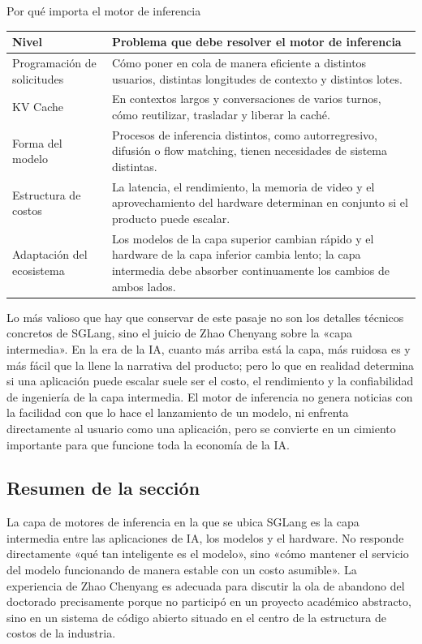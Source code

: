 \begin{knowledgebox}{Por qué importa el motor de inferencia}
\begin{tabularx}{\textwidth}{>{\raggedright\arraybackslash}p{} Y}
\toprule
Nivel & Problema que debe resolver el motor de inferencia \\
\midrule
Programación de solicitudes & Cómo poner en cola de manera eficiente a distintos usuarios, distintas longitudes de contexto y distintos lotes. \\
KV Cache & En contextos largos y conversaciones de varios turnos, cómo reutilizar, trasladar y liberar la caché. \\
Forma del modelo & Procesos de inferencia distintos, como autorregresivo, difusión o flow matching, tienen necesidades de sistema distintas. \\
Estructura de costos & La latencia, el rendimiento, la memoria de video y el aprovechamiento del hardware determinan en conjunto si el producto puede escalar. \\
Adaptación del ecosistema & Los modelos de la capa superior cambian rápido y el hardware de la capa inferior cambia lento; la capa intermedia debe absorber continuamente los cambios de ambos lados. \\
\bottomrule
\end{tabularx}
\end{knowledgebox}

Lo más valioso que hay que conservar de este pasaje no son los detalles técnicos concretos de SGLang, sino el juicio de Zhao Chenyang sobre la «capa intermedia». En la era de la IA, cuanto más arriba está la capa, más ruidosa es y más fácil que la llene la narrativa del producto; pero lo que en realidad determina si una aplicación puede escalar suele ser el costo, el rendimiento y la confiabilidad de ingeniería de la capa intermedia. El motor de inferencia no genera noticias con la facilidad con que lo hace el lanzamiento de un modelo, ni enfrenta directamente al usuario como una aplicación, pero se convierte en un cimiento importante para que funcione toda la economía de la IA.

\subsection{Resumen de la sección}

La capa de motores de inferencia en la que se ubica SGLang es la capa intermedia entre las aplicaciones de IA, los modelos y el hardware. No responde directamente «qué tan inteligente es el modelo», sino «cómo mantener el servicio del modelo funcionando de manera estable con un costo asumible». La experiencia de Zhao Chenyang es adecuada para discutir la ola de abandono del doctorado precisamente porque no participó en un proyecto académico abstracto, sino en un sistema de código abierto situado en el centro de la estructura de costos de la industria.
